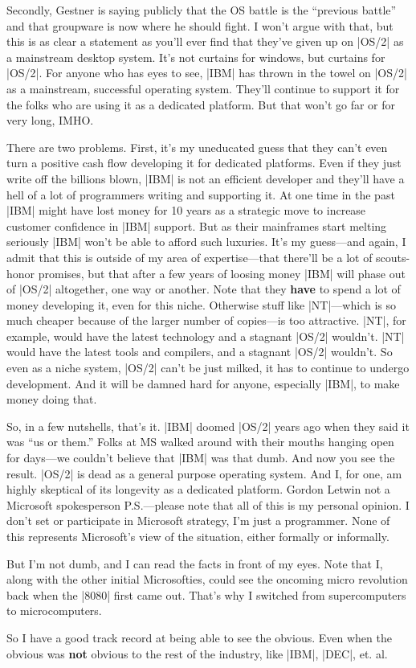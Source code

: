 Secondly, Gestner is saying publicly that the OS battle is the ``previous
battle'' and that groupware is now where he should fight.  I won't argue
with that, but this is as clear a statement as you'll ever find that they've
given up on |OS/2| as a mainstream desktop system.  It's not curtains for
windows, but curtains for |OS/2|.   For anyone who has eyes to see, |IBM|
has thrown in the towel on |OS/2| as a mainstream, successful operating system.
They'll continue to support it for the folks who are using it as a
dedicated platform.  But that won't go far or for very long, IMHO.

There are two problems.  First, it's my uneducated guess that they can't
even turn a positive cash flow developing it for dedicated platforms.
Even if they just write off the billions blown, |IBM| is not an efficient
developer and they'll have a hell of a lot of programmers writing and
supporting it.  At one time in the past |IBM| might have lost money for
10 years as a strategic move to increase customer confidence in |IBM|
support.  But as their mainframes start melting seriously |IBM| won't be
able to afford such luxuries.  It's my guess---and again, I admit that
this is outside of my area of expertise---that there'll be a lot of
scouts-honor promises, but that after a few years of loosing money
|IBM| will phase out of |OS/2| altogether, one way or another.  Note that they
{\bf have} to spend a lot of money developing it, even for this niche. Otherwise
stuff like |NT|---which is so much cheaper because of the larger number
of copies---is too attractive.  |NT|, for example, would have the latest
technology and a stagnant |OS/2| wouldn't.  |NT| would have the latest tools
and compilers, and a stagnant |OS/2| wouldn't.  So even as a niche system,
|OS/2| can't be just milked, it has to continue to undergo development.
And it will be damned hard for anyone, especially |IBM|, to make money
doing that.

So, in a few nutshells, that's it.  |IBM| doomed |OS/2| years ago when
they said it was ``us or them.''  Folks at MS walked around with their
mouths hanging open for days---we couldn't believe that |IBM| was that
dumb.  And now you see the result.  |OS/2| is dead as a general purpose
operating system.  And I, for one, am highly skeptical of its longevity
as a dedicated platform.
\medskip
{\parindent=3in\parskip=1pt \obeylines Gordon Letwin
not a Microsoft spokesperson\medskip
}
\noindent P.S.---please note that all of this is my personal opinion.  I don't
set or participate in Microsoft strategy, I'm just a programmer.  
None of this represents Microsoft's view of the situation, either
formally or informally.

But I'm not dumb, and I can read the facts in front of my eyes.  Note that
I, along with the other initial Microsofties, could see the oncoming
micro revolution back when the |8080| first came out.  That's why I
switched from supercomputers to microcomputers.  

So I have a good track record at being able to see the obvious.  Even
when the obvious was {\bf not} obvious to the rest of the industry, like
|IBM|, |DEC|, et. al.
\bye
